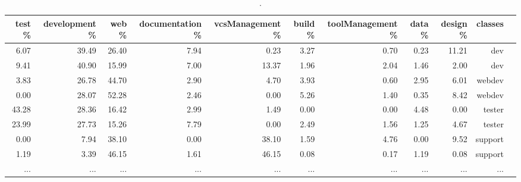\begin{table*}[]
\centering
\caption{. }
\label{tab:user_profiles}
\begin{tabular}{@{}rrrrrrrrrrl@{}}
   \toprule
   \textbf{test \%} & \textbf{development \%}       & \textbf{web \%}  & \textbf{documentation \%} & \textbf{vcsManagement \%}  & \textbf{build \%} & \textbf{toolManagement \%} & \textbf{data \%} & \textbf{design \%}  &\textbf{classes}                                                                              
   \\ \midrule
   6.07 & 39.49 & 26.40 & 7.94 & 0.23 & 3.27 & 0.70 & 0.23 & 11.21 & dev
   \\ \midrule
   9.41 & 40.90 & 15.99 & 7.00 & 13.37 & 1.96 & 2.04 & 1.46 & 2.00 & dev
   \\ \midrule
   3.83 & 26.78 & 44.70 & 2.90 & 4.70 & 3.93 & 0.60 & 2.95 & 6.01 & webdev
   \\ \midrule
   0.00 & 28.07 & 52.28 & 2.46 & 0.00 & 5.26 & 1.40 & 0.35 & 8.42 & webdev
   \\ \midrule
   43.28 & 28.36 & 16.42 & 2.99 & 1.49 & 0.00 & 0.00 & 4.48 & 0.00 & tester
   \\ \midrule
   23.99 & 27.73 & 15.26 & 7.79 & 0.00 & 2.49 & 1.56 & 1.25 & 4.67 & tester
   \\ \midrule
   0.00 & 7.94 & 38.10 & 0.00 & 38.10 & 1.59 & 4.76 & 0.00 & 9.52 & support
   \\ \midrule
   1.19 & 3.39 & 46.15 & 1.61 & 46.15 & 0.08 & 0.17 & 1.19 & 0.08 & support
   \\ \midrule
   ... & ... & ... & ... & ... & ... & ... & ... & ... & ...
   \\ \bottomrule
\end{tabular}
\end{table*}